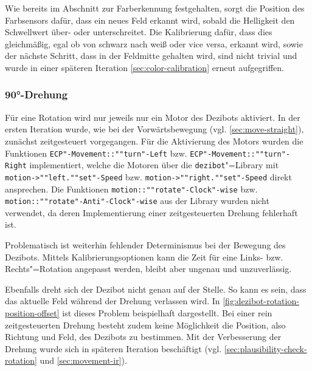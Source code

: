\begin{listing}[h]
    \inputminted{cpp}{../assets/code/ECPMovement-moveToNextField.cpp}
    \caption{Code"=Ausschnitt zur \texttt{ECP"-Movement::""move"-To"-Next"-Field}"=Funktion.}
    \label{code:move-to-next-field}
\end{listing}

Wie bereits im Abschnitt zur Farberkennung festgehalten, sorgt die Position des Farbsensors dafür, dass ein neues Feld erkannt wird, sobald die Helligkeit den Schwellwert über- oder unterschreitet.
Die Kalibrierung dafür, dass dies gleichmäßig, egal ob von schwarz nach weiß oder vice versa, erkannt wird, sowie der nächste Schritt, dass in der Feldmitte gehalten wird, sind nicht trivial und wurde in einer späteren Iteration \autoref{sec:color-calibration} erneut aufgegriffen. 



\subsubsection{90°-Drehung}
\label{sec:turn-90}

Für eine Rotation wird nur jeweils nur ein Motor des Dezibots aktiviert. In der ersten Iteration wurde, wie bei der Vorwärtsbewegung (vgl. \autoref{sec:move-straight}), zunächst zeitgesteuert vorgegangen. Für die Aktivierung des Motors wurden die Funktionen \texttt{ECP"-Movement::""turn"-Left} bzw. \texttt{ECP"-Movement::""turn"-Right} implementiert, welche die Motoren über die \texttt{dezibot}"=Library mit \texttt{motion->""left.""set"-Speed} bzw. \texttt{motion->""right.""set"-Speed} direkt ansprechen.
Die Funktionen \texttt{motion::""rotate"-Clock"-wise} bzw. \texttt{motion::""rotate"-Anti"-Clock"-wise} aus der Library wurden nicht verwendet, da deren Implementierung einer zeitgesteuerten Drehung fehlerhaft ist.

Problematisch ist weiterhin fehlender Determinismus bei der Bewegung des Dezibots. Mittels Kalibrierungsoptionen kann die Zeit für eine Links- bzw. Rechts"=Rotation angepasst werden, bleibt aber ungenau und unzuverlässig.

Ebenfalls dreht sich der Dezibot nicht genau auf der Stelle. So kann es sein, dass das aktuelle Feld während der Drehung verlassen wird. In \autoref{fig:dezibot-rotation-position-offset} ist dieses Problem beispielhaft dargestellt. Bei einer rein zeitgesteuerten Drehung besteht zudem keine Möglichkeit die Position, also Richtung und Feld, des Dezibots zu bestimmen. Mit der Verbesserung der Drehung wurde sich in späteren Iteration beschäftigt (vgl. \autoref{sec:plausibility-check-rotation} und \autoref{sec:movement-ir}).

